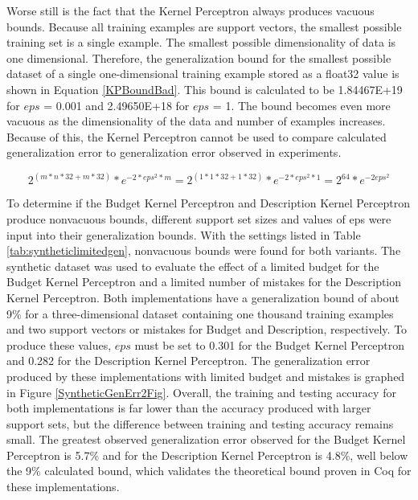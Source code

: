 Worse still is the fact that the Kernel Perceptron always produces vacuous bounds. Because all training examples are support vectors, the smallest possible training set is a single example. The smallest possible dimensionality of data is one dimensional. Therefore, the generalization bound for the smallest possible dataset of a single one-dimensional training example stored as a float32 value is shown in Equation \ref{KPBoundBad}. This bound is calculated to be 1.84467E+19 for $\mathit{eps}$ = 0.001 and 2.49650E+18 for $\mathit{eps}$ = 1. The bound becomes even more vacuous as the dimensionality of the data and number of examples increases. Because of this, the Kernel Perceptron cannot be used to compare calculated generalization error to generalization error observed in experiments.

\begin{equation} \label{KPBoundBad}
 2^{(m*n*32 + m*32)} * e^{-2*eps^{2}*m} = 2^{(1*1*32 + 1*32)} * e^{-2*eps^{2}*1} = 2^{64}*e^{-2eps^{2}}
\end{equation}

To determine if the Budget Kernel Perceptron and Description Kernel Perceptron produce nonvacuous bounds, different support set sizes and values of eps were input into their generalization bounds. With the settings listed in Table \ref{tab:syntheticlimitedgen}, nonvacuous bounds were found for both variants. The synthetic dataset was used to evaluate the effect of a limited budget for the Budget Kernel Perceptron and a limited number of mistakes for the Description Kernel Perceptron. Both implementations have a generalization bound of about 9\% for a three-dimensional dataset containing one thousand training examples and two support vectors or mistakes for Budget and Description, respectively. To produce these values, $\mathit{eps}$ must be set to 0.301 for the Budget Kernel Perceptron and 0.282 for the Description Kernel Perceptron. The generalization error produced by these implementations with limited budget and mistakes is graphed in Figure \ref{SyntheticGenErr2Fig}. Overall, the training and testing accuracy for both implementations is far lower than the accuracy produced with larger support sets, but the difference between training and testing accuracy remains small. The greatest observed generalization error observed for the Budget Kernel Perceptron is 5.7\% and for the Description Kernel Perceptron is 4.8\%, well below the 9\% calculated bound, which validates the theoretical bound proven in Coq for these implementations.

